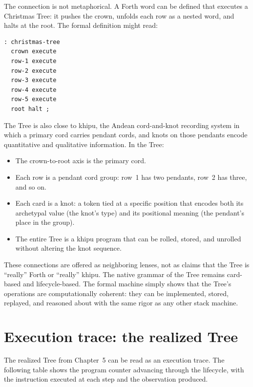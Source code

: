 The connection is not metaphorical. A Forth word can be defined that executes
a Christmas Tree: it pushes the crown, unfolds each row as a nested word, and
halts at the root. The formal definition might read:

\begin{verbatim}
: christmas-tree
  crown execute
  row-1 execute
  row-2 execute
  row-3 execute
  row-4 execute
  row-5 execute
  root halt ;
\end{verbatim}

The Tree is also close to khipu, the Andean cord-and-knot recording system in
which a primary cord carries pendant cords, and knots on those pendants encode
quantitative and qualitative information. In the Tree:

\begin{itemize}
\item The crown-to-root axis is the primary cord.
\item Each row is a pendant cord group: row~1 has two pendants, row~2 has three,
      and so on.
\item Each card is a knot: a token tied at a specific position that encodes both
      its archetypal value (the knot's type) and its positional meaning (the
      pendant's place in the group).
\item The entire Tree is a khipu program that can be rolled, stored, and
      unrolled without altering the knot sequence.
\end{itemize}

These connections are offered as neighboring lenses, not as claims that the Tree
is ``really'' Forth or ``really'' khipu. The native grammar of the Tree remains
card-based and lifecycle-based. The formal machine simply shows that the Tree's
operations are computationally coherent: they can be implemented, stored,
replayed, and reasoned about with the same rigor as any other stack machine.

\section{Execution trace: the realized Tree}

The realized Tree from Chapter~5 can be read as an execution trace. The
following table shows the program counter advancing through the lifecycle,
with the instruction executed at each step and the observation produced.

